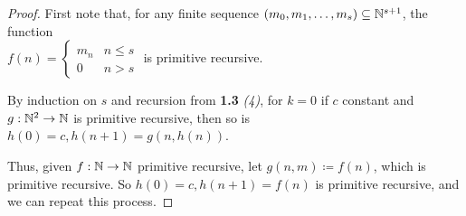 \documentclass[10pt,a4paper]{article}
\begin{document}
\begin{proof}
First note that, for any finite sequence $(m_0, m_1, \ldots, m_s)\subseteq\mathbb{N}^{s+1}$, the function\\ $f(n) = \begin{cases} m_n &n\leq s \\ 0 & n>s \end{cases}$ is primitive recursive.

By induction on $s$ and recursion from \textbf{1.3} \textit{(4)}, for $k=0$ if $c$ constant and $g:\mathbb{N}^2 \rightarrow \mathbb{N}$ is primitive recursive, then so is $h(0) = c, h(n+1) = g(n, h(n))$.

Thus, given $f:\mathbb{N}\rightarrow\mathbb{N}$ primitive recursive, let $g(n,m) \coloneqq f(n)$, which is primitive recursive. So $h(0)=c, h(n+1)=f(n)$ is primitive recursive, and we can repeat this process. 


\end{proof}
\end{document}
